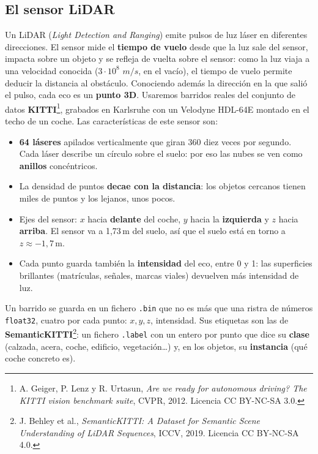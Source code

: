 \documentclass{article}
\begin{document}
\subsection{El sensor LiDAR}
Un LiDAR (\textit{Light Detection and Ranging}) emite pulsos de luz láser en diferentes direcciones. El sensor mide el \textbf{tiempo de vuelo} desde que la luz sale del sensor, impacta sobre un objeto y se refleja de vuelta sobre el sensor: como la luz viaja a una velocidad conocida ($3\cdot 10^8$ $m/s$, en el vacío), el tiempo de vuelo permite deducir la distancia al obstáculo. Conociendo además la dirección en la que salió el pulso, cada eco es un \textbf{punto 3D}. Usaremos barridos reales del conjunto de datos \textbf{KITTI}\footnote{A. Geiger, P. Lenz y R. Urtasun, \textit{Are we ready for autonomous driving? The KITTI vision benchmark suite}, CVPR, 2012. Licencia CC BY-NC-SA 3.0.}, grabados en Karlsruhe con un Velodyne HDL-64E montado en el techo de un coche. Las características de este sensor son:
\begin{itemize}
    \item \textbf{64 láseres} apilados verticalmente que giran 360\textdegree{} diez veces por segundo. Cada láser describe un círculo sobre el suelo: por eso las nubes se ven como \textbf{anillos} concéntricos.
    \item La densidad de puntos \textbf{decae con la distancia}: los objetos cercanos tienen miles de puntos y los lejanos, unos pocos.
    \item Ejes del sensor: $x$ hacia \textbf{delante} del coche, $y$ hacia la \textbf{izquierda} y $z$ hacia \textbf{arriba}. El sensor va a 1{,}73\,m del suelo, así que el suelo está en torno a $z \approx -1{,}7$\,m.
    \item Cada punto guarda también la \textbf{intensidad} del eco, entre 0 y 1: las superficies brillantes (matrículas, señales, marcas viales) devuelven más intensidad de luz.
\end{itemize}
Un barrido se guarda en un fichero \texttt{.bin} que no es más que una ristra de números \texttt{float32}, cuatro por cada punto: $x, y, z$, intensidad. Sus etiquetas son las de \textbf{SemanticKITTI}\footnote{J. Behley et al., \textit{SemanticKITTI: A Dataset for Semantic Scene Understanding of LiDAR Sequences}, ICCV, 2019. Licencia CC BY-NC-SA 4.0.}: un fichero \texttt{.label} con un entero por punto que dice su \textbf{clase} (calzada, acera, coche, edificio, vegetación\dots) y, en los objetos, su \textbf{instancia} (qué coche concreto es).
\end{document}
